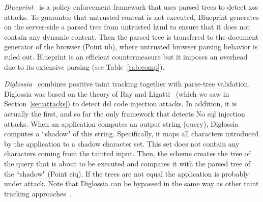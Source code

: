 \documentclass[conference]{IEEEtran}
\begin{document}
{\it Blueprint}~\cite{LV09} is a policy enforcement framework that
uses parsed trees to detect {\sc xss} attacks. To guarantee
that untrusted content is not executed, Blueprint generates on the
server-side a parsed tree from untrusted {\sc html} to ensure that it
does not contain any dynamic content. Then the parsed tree is
transfered to the document generator of the browser (Point {\sc ub}),
where untrusted browser parsing behavior is ruled out.
Blueprint is an efficient countermeasure but it imposes an
overhead due to its extensive parsing (see Table~\ref{tab:comp}).

{\it Diglossia}~\cite{SMS13} combines positive taint tracking together
with parse-tree validation. Diglossia was based on the theory of Ray
and Ligatti~\cite{RL12b} (which we saw in Section~\ref{sec:attacks})
to detect {\sc dsl} code injection attacks. In addition, it is
actually the first, and so far the only framework that detects No{\sc
  sql} injection attacks. When an application computes an output
string (query), Diglossia computes a ``shadow" of this string.
Specifically, it maps all characters introduced by the application to
a shadow character set. This set does not contain any characters
coming from the tainted input. Then, the scheme creates the tree of
the query that is about to be executed and compares it with the parsed
tree of the ``shadow" (Point {\sc e}i{\sc q}). If the trees are not
equal the application is probably under attack. Note that Diglossia
can be bypassed in the same way as other taint tracking
approaches~\cite{NBR14}.
\end{document}
